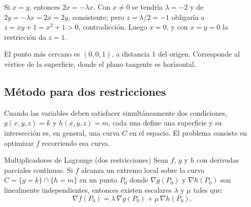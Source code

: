 Si $x = y$, entonces $2x = -\lambda x$. Con $x \neq 0$ se tendría $\lambda = -2$ y de $2y = -\lambda x = 2x = 2y$, consistente; pero $z = \lambda/2 = -1$ obligaría a $z = xy + 1 = x^2 + 1 > 0$, contradicción. Luego $x = 0$, y con $x = y = 0$ la restricción da $z = 1$.

El punto más cercano es $(0, 0, 1)$, a distancia $1$ del origen. Corresponde al vértice de la superficie, donde el plano tangente es horizontal.

\begin{center}
\shorthandoff{>}
\end{center}

\subsection{Método para dos restricciones}

Cuando las variables deben satisfacer simultáneamente dos condiciones, $g(x, y, z) = k$ y $h(x, y, z) = m$, cada una define una superficie y su intersección es, en general, una curva $C$ en el espacio. El problema consiste en optimizar $f$ recorriendo esa curva.

\begin{mytheorem}{Multiplicadores de Lagrange (dos restricciones)}
Sean $f$, $g$ y $h$ con derivadas parciales continuas. Si $f$ alcanza un extremo local sobre la curva $C = \{g = k\} \cap \{h = m\}$ en un punto $P_0$ donde $\nabla g(P_0)$ y $\nabla h(P_0)$ son linealmente independientes, entonces existen escalares $\lambda$ y $\mu$ tales que:
\[
\nabla f(P_0) = \lambda\, \nabla g(P_0) + \mu\, \nabla h(P_0).
\]
\end{mytheorem}

